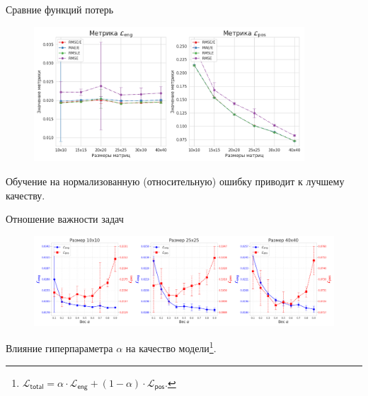 \documentclass[9pt]{beamer}
\begin{document}
\begin{frame}{Сравние функций потерь}
    \begin{figure}
        \centering
        \includegraphics[width=0.9\textwidth]{../report/graphics/loss_comp.png}
    \end{figure}

    \begin{block}{}
        Обучение на нормализованную (относительную) ошибку приводит к лучшему качеству.
    \end{block}
\end{frame}

\begin{frame}{Отношение важности задач}
    \begin{figure}
        \centering
        \includegraphics[width=1.0\textwidth]{../report/graphics/exp3_alpha_std.png}
    \end{figure}

    \begin{block}{}
        Влияние гиперпараметра $\alpha$ на качество модели\footnote{$\mathcal{L}_{\mathsf{total}} = \alpha \cdot \mathcal{L}_{\mathsf{eng}} + (1 - \alpha) \cdot \mathcal{L}_{\mathsf{pos}}$.}.
    \end{block}
\end{frame}
\end{document}
